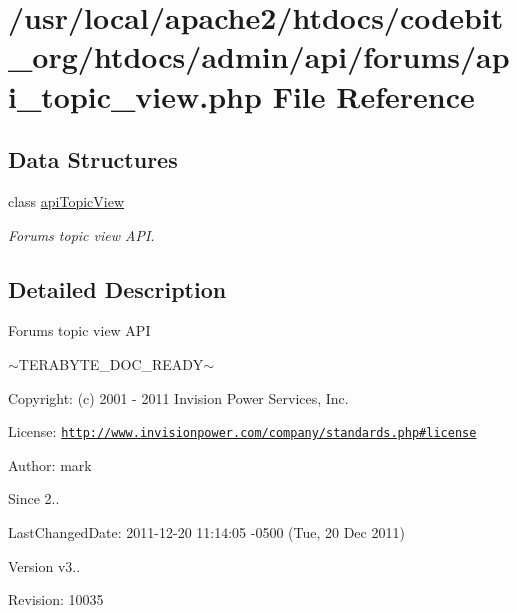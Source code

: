 \hypertarget{api__topic__view_8php}{\section{/usr/local/apache2/htdocs/codebit\-\_\-org/htdocs/admin/api/forums/api\-\_\-topic\-\_\-view.php File Reference}
\label{api__topic__view_8php}
}
\subsection*{Data Structures}
\begin{DoxyCompactItemize}
\item 
class \hyperlink{classapi_topic_view}{api\-Topic\-View}
\begin{DoxyCompactList}\small\item\em Forums topic view A\-P\-I. \end{DoxyCompactList}\end{DoxyCompactItemize}


\subsection{Detailed Description}
\begin{DoxyVerb}  Forums topic view API
\end{DoxyVerb}
 $\sim$\-T\-E\-R\-A\-B\-Y\-T\-E\-\_\-\-D\-O\-C\-\_\-\-R\-E\-A\-D\-Y$\sim$ \begin{DoxyParagraph}{Copyright\-:}
(c) 2001 -\/ 2011 Invision Power Services, Inc.
\end{DoxyParagraph}
\begin{DoxyParagraph}{License\-:}
\href{http://www.invisionpower.com/company/standards.php#license}{\tt http\-://www.\-invisionpower.\-com/company/standards.\-php\#license}
\end{DoxyParagraph}
\begin{DoxyParagraph}{Author\-:}
mark 
\end{DoxyParagraph}
\begin{DoxySince}{Since}
2.. 
\end{DoxySince}
\begin{DoxyParagraph}{Last\-Changed\-Date\-:}
2011-\/12-\/20 11\-:14\-:05 -\/0500 (Tue, 20 Dec 2011) 
\end{DoxyParagraph}
\begin{DoxyVersion}{Version}
v3.. 
\end{DoxyVersion}
\begin{DoxyParagraph}{Revision\-:}
10035 
\end{DoxyParagraph}
